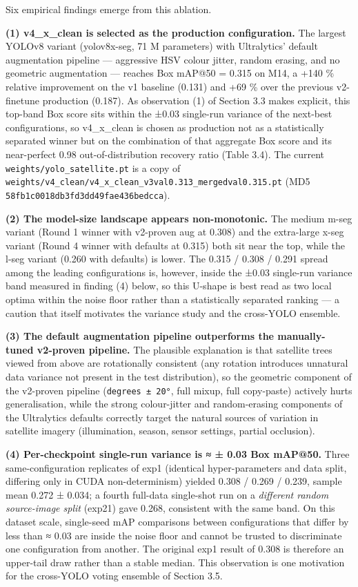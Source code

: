 Six empirical findings emerge from this ablation.

\textbf{(1) v4\_x\_clean is selected as the production configuration.} The largest YOLOv8 variant (yolov8x-seg, 71 M parameters) with Ultralytics' default augmentation pipeline --- aggressive HSV colour jitter, random erasing, and no geometric augmentation --- reaches Box mAP@50 = 0.315 on M14, a +140 \% relative improvement on the v1 baseline (0.131) and +69 \% over the previous v2-finetune production (0.187). As observation (1) of Section 3.3 makes explicit, this top-band Box score sits within the ±0.03 single-run variance of the next-best configurations, so v4\_x\_clean is chosen as production not as a statistically separated winner but on the combination of that aggregate Box score and its near-perfect 0.98 out-of-distribution recovery ratio (Table 3.4). The current \texttt{weights/yolo\_satellite.pt} is a copy of \texttt{weights/v4\_clean/v4\_x\_clean\_v3val0.313\_mergedval0.315.pt} (MD5 \texttt{58fb1c0018db3fd3dd49fae436bedcca}).

\textbf{(2) The model-size landscape appears non-monotonic.} The medium m-seg variant (Round 1 winner with v2-proven aug at 0.308) and the extra-large x-seg variant (Round 4 winner with defaults at 0.315) both sit near the top, while the l-seg variant (0.260 with defaults) is lower. The 0.315 / 0.308 / 0.291 spread among the leading configurations is, however, inside the ±0.03 single-run variance band measured in finding (4) below, so this U-shape is best read as two local optima within the noise floor rather than a statistically separated ranking --- a caution that itself motivates the variance study and the cross-YOLO ensemble.

\textbf{(3) The default augmentation pipeline outperforms the manually-tuned v2-proven pipeline.} The plausible explanation is that satellite trees viewed from above are rotationally consistent (any rotation introduces unnatural data variance not present in the test distribution), so the geometric component of the v2-proven pipeline (\texttt{degrees\ ±\ 20°}, full mixup, full copy-paste) actively hurts generalisation, while the strong colour-jitter and random-erasing components of the Ultralytics defaults correctly target the natural sources of variation in satellite imagery (illumination, season, sensor settings, partial occlusion).

\textbf{(4) Per-checkpoint single-run variance is ≈ ± 0.03 Box mAP@50.} Three same-configuration replicates of exp1 (identical hyper-parameters and data split, differing only in CUDA non-determinism) yielded 0.308 / 0.269 / 0.239, sample mean 0.272 ± 0.034; a fourth full-data single-shot run on a \emph{different random source-image split} (exp21) gave 0.268, consistent with the same band. On this dataset scale, single-seed mAP comparisons between configurations that differ by less than ≈ 0.03 are inside the noise floor and cannot be trusted to discriminate one configuration from another. The original exp1 result of 0.308 is therefore an upper-tail draw rather than a stable median. This observation is one motivation for the cross-YOLO voting ensemble of Section 3.5.

